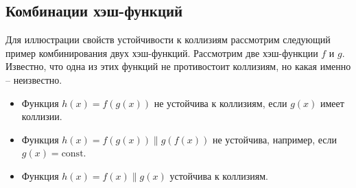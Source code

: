 \subsection{Комбинации хэш-функций}

Для иллюстрации свойств устойчивости к коллизиям рассмотрим следующий пример комбинирования двух хэш-функций. Рассмотрим две хэш-функции $f$ и $g$. Известно, что одна из этих функций не противостоит коллизиям, но какая именно -- неизвестно.
\begin{itemize}
    \item Функция $h(x) = f(g(x))$ не устойчива к коллизиям, если $g(x)$ имеет коллизии.
    \item Функция $h(x) = f(g(x)) \| g(f(x))$ не устойчива, например, если $g(x) = \textrm{const}$.
    \item Функция $h(x) = f(x) \| g(x)$ устойчива к коллизиям.
\end{itemize}
